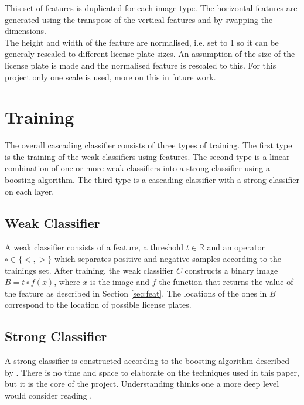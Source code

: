 \documentclass[a4paper,11pt]{article}
\begin{document}
This set of features is duplicated for each image type. The horizontal features
are generated using the transpose of the vertical features and by swapping the
dimensions.\\
The height and width of the feature are normalised, i.e. set to 1 so it can be
generaly rescaled to different license plate sizes.  An assumption of the
size of the license plate is made and the normalised feature is rescaled to
this. For this project only one scale is used, more on this in future work.\\



\section{Training} \label{sec:train}
The overall cascading classifier consists of three types of training. The first
type is the training of the weak classifiers using features. The second type is
a linear combination of one or more weak classifiers into a strong classifier
using a boosting algorithm. The third type is a cascading classifier
with a strong classifier on each layer.

\subsection{Weak Classifier} \label{sec:weak}
A weak classifier consists of a feature, a threshold $t \in \mathbb{R}$ and an
operator $\circ \in \{<, >\}$ which separates positive and negative samples
according to the trainings set. After training, the weak classifier $C$
constructs a binary image $B = t \circ f(x)$, where $x$ is the image and $f$
the function that returns the value of the feature as described in 
Section \ref{sec:feat}. The locations of the ones in $B$ correspond to the location of
possible license plates.

\subsection{Strong Classifier} \label{sec:strong}
A strong classifier is constructed according to the boosting algorithm
described by \cite{viola}. There is no time and space to elaborate on the
techniques used in this paper, but it is the core of the project. Understanding
thinks one a more deep level would consider reading \cite{viola}.\\
\end{document}
